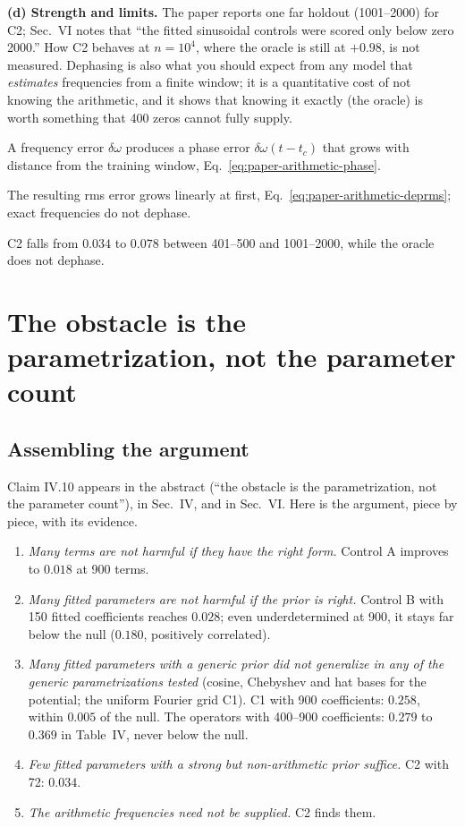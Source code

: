\textbf{(d) Strength and limits.} The paper reports one far holdout (1001--2000) for C2; Sec.~VI notes that ``the fitted sinusoidal controls were scored only below zero 2000.'' How C2 behaves at $n=10^4$, where the oracle is still at $+0.98$, is not measured. Dephasing is also what you should expect from any model that \emph{estimates} frequencies from a finite window; it is a quantitative cost of not knowing the arithmetic, and it shows that knowing it exactly (the oracle) is worth something that 400 zeros cannot fully supply.

\begin{keyideas}
\item A frequency error $\delta\omega$ produces a phase error $\delta\omega(t-t_c)$ that grows with distance from the training window, Eq.~\eqref{eq:paper-arithmetic-phase}.
\item The resulting rms error grows linearly at first, Eq.~\eqref{eq:paper-arithmetic-deprms}; exact frequencies do not dephase.
\item C2 falls from $0.034$ to $0.078$ between 401--500 and 1001--2000, while the oracle does not dephase.
\end{keyideas}

\section{The obstacle is the parametrization, not the parameter count}\label{sec:paper-arithmetic-param}

\subsection{Assembling the argument}

Claim IV.10 appears in the abstract (``the obstacle is the parametrization, not the parameter count''), in Sec.~IV, and in Sec.~VI. Here is the argument, piece by piece, with its evidence.

\begin{enumerate}
\item \emph{Many terms are not harmful if they have the right form.} Control A improves to $0.018$ at 900 terms.
\item \emph{Many fitted parameters are not harmful if the prior is right.} Control B with 150 fitted coefficients reaches $0.028$; even underdetermined at 900, it stays far below the null ($0.180$, positively correlated).
\item \emph{Many fitted parameters with a generic prior did not generalize in any of the generic parametrizations tested} (cosine, Chebyshev and hat bases for the potential; the uniform Fourier grid C1). C1 with 900 coefficients: $0.258$, within $0.005$ of the null. The operators with 400--900 coefficients: $0.279$ to $0.369$ in Table~IV, never below the null.
\item \emph{Few fitted parameters with a strong but non-arithmetic prior suffice.} C2 with 72: $0.034$.
\item \emph{The arithmetic frequencies need not be supplied.} C2 finds them.
\end{enumerate}


